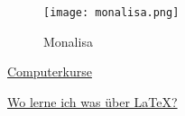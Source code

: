 \documentclass{scrartcl}
\begin{document}

\begin{figure}
\centering
\texttt{[image: monalisa.png]}
\caption{Monalisa}
\end{figure}



\href{http://fit.rwth-aachen.de}{\hypertarget{xxx}{Computerkurse}}



\pagebreak
\hyperlink{xxx}{Wo lerne ich was über \LaTeX?}
\end{document}
